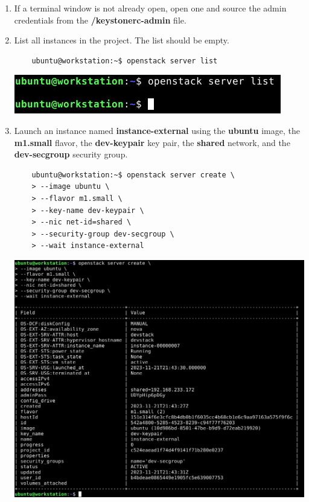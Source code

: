 \documentclass[letterpaper, 12pt]{article}
\begin{document}
\begin{enumerate}
    \item If a terminal window is not already open, open one and source the admin credentials from the 
    \textbf{\texttildemid/keystonerc-admin} file.

    \item List all instances in the project. The list should be empty.
    \begin{lstlisting}
    ubuntu@workstation:~$ openstack server list
    \end{lstlisting}

    \begin{center}
        \includegraphics[width=\linewidth]{images/part5/step2.png}
    \end{center}

    \item Launch an instance named \textbf{instance-external} using the \textbf{ubuntu} image, the \textbf{m1.small}
    flavor, the \textbf{dev-keypair} key pair, the \textbf{shared} network, and the \textbf{dev-secgroup} security
    group.
    \begin{lstlisting}
    ubuntu@workstation:~$ openstack server create \
    > --image ubuntu \
    > --flavor m1.small \
    > --key-name dev-keypair \
    > --nic net-id=shared \
    > --security-group dev-secgroup \
    > --wait instance-external
    \end{lstlisting}

    \begin{center}
        \includegraphics[width=\linewidth]{images/part5/step3.png}
    \end{center}


\end{enumerate}
\end{document}
